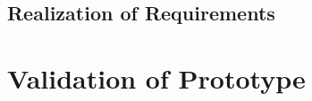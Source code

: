 	
	
	
	
	\subsection{Realization of Requirements}
	\label{subsec:realizationofrequirements}
	
	\section{Validation of Prototype}
	\label{sec:validation}

	

	



